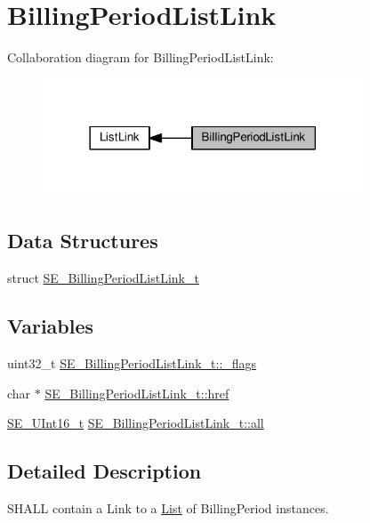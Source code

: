 \hypertarget{group__BillingPeriodListLink}{}\section{Billing\+Period\+List\+Link}
\label{group__BillingPeriodListLink}
Collaboration diagram for Billing\+Period\+List\+Link\+:\nopagebreak
\begin{figure}[H]
\begin{center}
\leavevmode
\includegraphics[width=270pt]{group__BillingPeriodListLink}
\end{center}
\end{figure}
\subsection*{Data Structures}
\begin{DoxyCompactItemize}
\item 
struct \hyperlink{structSE__BillingPeriodListLink__t}{S\+E\+\_\+\+Billing\+Period\+List\+Link\+\_\+t}
\end{DoxyCompactItemize}
\subsection*{Variables}
\begin{DoxyCompactItemize}
\item 
uint32\+\_\+t \hyperlink{group__BillingPeriodListLink_ga7caa40e6d3c99533fb043c648b6622a4}{S\+E\+\_\+\+Billing\+Period\+List\+Link\+\_\+t\+::\+\_\+flags}
\item 
char $\ast$ \hyperlink{group__BillingPeriodListLink_gaa205c380cc70507b95b3e88d00f99a15}{S\+E\+\_\+\+Billing\+Period\+List\+Link\+\_\+t\+::href}
\item 
\hyperlink{group__UInt16_gac68d541f189538bfd30cfaa712d20d29}{S\+E\+\_\+\+U\+Int16\+\_\+t} \hyperlink{group__BillingPeriodListLink_ga6f46995c2700dabe61ac54cc90275c58}{S\+E\+\_\+\+Billing\+Period\+List\+Link\+\_\+t\+::all}
\end{DoxyCompactItemize}


\subsection{Detailed Description}
S\+H\+A\+LL contain a Link to a \hyperlink{structList}{List} of Billing\+Period instances. 


